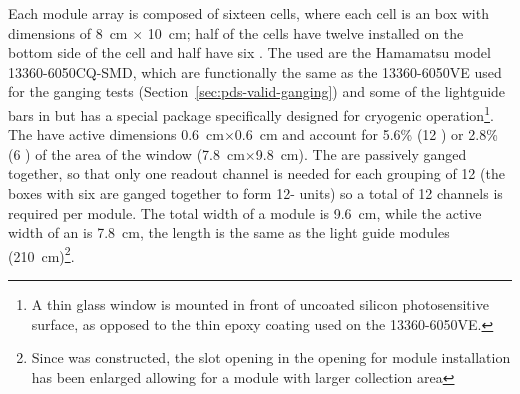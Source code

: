 Each   module array is composed of sixteen cells, where each cell is an  box with dimensions of \SI{8}{cm} $\times$ \SI{10}{cm}; half of the cells have twelve  installed on the bottom side of the cell and  half have six . The  used are the Hamamatsu model 13360-6050CQ-SMD, which are functionally the same as the 13360-6050VE used for the ganging tests (Section~\ref{sec:pds-valid-ganging}) and some of the lightguide bars in  but has a special package specifically designed for cryogenic operation\footnote{A thin glass window is mounted in front of uncoated silicon photosensitive surface, as opposed to the thin epoxy coating used on the 13360-6050VE.}. 
The  have active dimensions \SI{0.6}{cm}$\times$\SI{0.6}{cm} and account for 5.6\% (\num{12} ) or \num{2.8}\% (\num{6} ) of the area of the window (\SI{7.8}{cm}$\times$\SI{9.8}{cm}).
The   are passively ganged together, so that only one readout channel is needed for each  grouping of \num{12}  (the boxes with six  are ganged together to form \num{12}- units) so a total of \num{12} channels is required per module. 
The total width of a module is \SI{9.6}{cm}, while the active width of an  is \SI{7.8}{cm}, the length is the same as the light guide modules (\SI{210}{cm})\footnote{Since  was constructed, the slot opening in the  opening for  module installation has been enlarged allowing for a module with larger collection area}.



